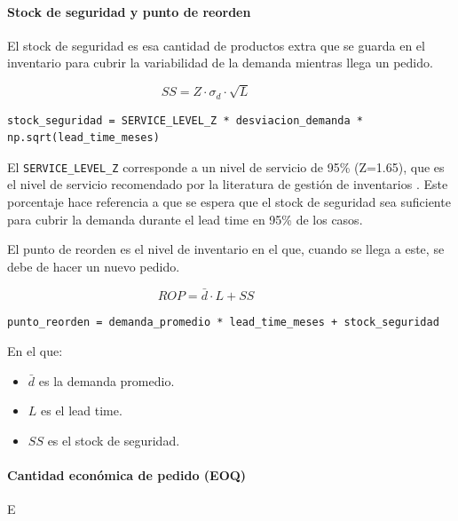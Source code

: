 \paragraph{Stock de seguridad y punto de reorden}

El stock de seguridad es esa cantidad de productos extra que se guarda en el inventario para cubrir la variabilidad de la demanda mientras llega un pedido. 

\[
SS = Z \cdot \sigma_d \cdot \sqrt{L}
\qquad\qquad
\]

\begin{verbatim}
stock_seguridad = SERVICE_LEVEL_Z * desviacion_demanda * np.sqrt(lead_time_meses)
\end{verbatim}

El \texttt{SERVICE\_LEVEL\_Z} corresponde a un nivel de servicio de 95\% (Z=1.65), que es el nivel de servicio recomendado por la literatura de gestión de inventarios \cite{chopra2020supply}. Este porcentaje hace referencia a que se espera que el stock de seguridad sea suficiente para cubrir la demanda durante el lead time en 95\% de los casos.

El punto de reorden es el nivel de inventario en el que, cuando se llega a este, se debe de hacer un nuevo pedido.

\[
ROP = \bar{d} \cdot L + SS
\qquad\qquad
\]

\begin{verbatim}
punto_reorden = demanda_promedio * lead_time_meses + stock_seguridad
\end{verbatim}

En el que:
\begin{itemize}
    \item $\bar{d}$ es la demanda promedio.
    \item $L$ es el lead time.
    \item $SS$ es el stock de seguridad.
\end{itemize}

\paragraph{Cantidad económica de pedido (EOQ)}

E